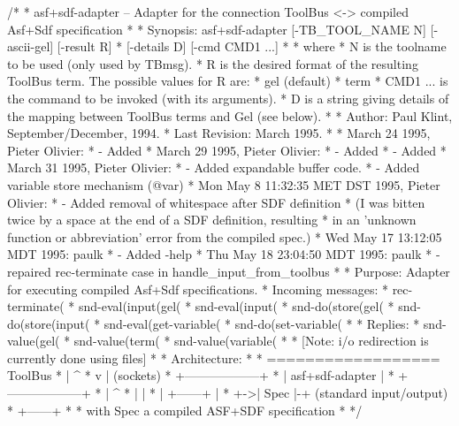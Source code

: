 \endmoddef\let\nwnotused=\nwoutput{}\nwstartdeflinemarkup\nwenddeflinemarkup
/* 
 * asf+sdf-adapter -- Adapter for the connection ToolBus <-> compiled Asf+Sdf specification
 *
 * Synopsis: asf+sdf-adapter [-TB_TOOL_NAME N] [-ascii-gel] [-result R] 
 *                           [-details D] [-cmd CMD1 ...]
 *
 * where
 * N    is the toolname to be used (only used by TBmsg).
 * R    is the desired format of the resulting ToolBus term. The possible values for R are:
 *          gel (default)
 *          term
 * CMD1 ...  is the command to be invoked (with its arguments).
 * D    is a string giving details of the mapping between ToolBus terms and Gel (see below).
 *
 * Author:        Paul Klint, September/December, 1994.
 * Last Revision: March 1995.
 *
 * March 24 1995, Pieter Olivier:
 * - Added %
 * March 29 1995, Pieter Olivier:
 * - Added %
 * - Added %
 * March 31 1995, Pieter Olivier:
 * - Added expandable buffer code.
 * - Added variable store mechanism (@var)
 * Mon May  8 11:32:35 MET DST 1995, Pieter Olivier:
 * - Added removal of whitespace after SDF definition
 *   (I was bitten twice by a space at the end of a SDF definition, resulting
 *    in an 'unknown function or abbreviation' error from the compiled spec.)
 * Wed May 17 13:12:05 MDT 1995: paulk
 * - Added -help
 * Thu May 18 23:04:50 MDT 1995: paulk
 * - repaired rec-terminate case in handle_input_from_toolbus
 *
 * Purpose: Adapter for executing compiled Asf+Sdf specifications.
 * Incoming messages:
 *    rec-terminate(%
 *    snd-eval(input(gel(%
 *    snd-eval(input(%
 *    snd-do(store(gel(%
 *    snd-do(store(input(%
 *    snd-eval(get-variable(%
 *    snd-do(set-variable(%
 *
 * Replies:
 *    snd-value(gel(%
 *    snd-value(term(%
 *    snd-value(variable(%
 *
 * [Note: i/o redirection is currently done using files]
 *
 * Architecture:
 *
 *         ================== ToolBus
 *           |           ^
 *           v           |    (sockets)
 *         +------------------+
 *         |  asf+sdf-adapter |
 *         +------------------+
 *           |           ^
 *           |           |
 *           |  +------+ |
 *           +->| Spec |-+    (standard input/output)
 *              +------+
 *
 * with Spec a compiled ASF+SDF specification
 *
 */

